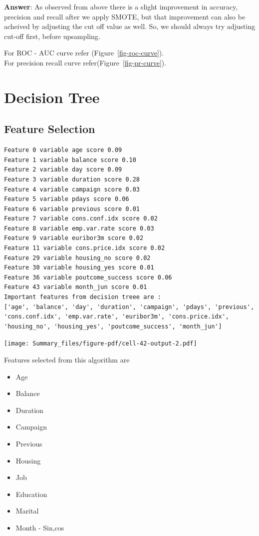 \documentclass[
  letterpaper,
  DIV=11,
  numbers=noendperiod]{scrartcl}
\providecommand{\tightlist}{%
  \setlength{\itemsep}{0pt}\setlength{\parskip}{0pt}}\usepackage{longtable,booktabs,array}
\begin{document}
\textbf{Answer}: As observed from above there is a slight improvement in
accuracy, precision and recall after we apply SMOTE, but that
improvement can also be acheived by adjusting the cut off value as well.
So, we should always try adjusting cut-off first, before upsampling.

For ROC - AUC curve refer (Figure~\ref{fig-roc-curve}).\\
For precision recall curve refer(Figure~\ref{fig-pr-curve}).

\hypertarget{decision-tree}{%
\section{Decision Tree}\label{decision-tree}}

\hypertarget{feature-selection}{%
\subsection{Feature Selection}\label{feature-selection}}

\begin{verbatim}
Feature 0 variable age score 0.09
Feature 1 variable balance score 0.10
Feature 2 variable day score 0.09
Feature 3 variable duration score 0.28
Feature 4 variable campaign score 0.03
Feature 5 variable pdays score 0.06
Feature 6 variable previous score 0.01
Feature 7 variable cons.conf.idx score 0.02
Feature 8 variable emp.var.rate score 0.03
Feature 9 variable euribor3m score 0.02
Feature 11 variable cons.price.idx score 0.02
Feature 29 variable housing_no score 0.02
Feature 30 variable housing_yes score 0.01
Feature 36 variable poutcome_success score 0.06
Feature 43 variable month_jun score 0.01
Important features from decision treee are : 
['age', 'balance', 'day', 'duration', 'campaign', 'pdays', 'previous', 'cons.conf.idx', 'emp.var.rate', 'euribor3m', 'cons.price.idx', 'housing_no', 'housing_yes', 'poutcome_success', 'month_jun']
\end{verbatim}

\texttt{[image: Summary\_files/figure-pdf/cell-42-output-2.pdf]}

Features selected from this algorithm are

\begin{itemize}
\tightlist
\item
  Age
\item
  Balance
\item
  Duration
\item
  Campaign
\item
  Previous
\item
  Housing
\item
  Job
\item
  Education
\item
  Marital
\item
  Month - Sin,cos
\end{itemize}
\end{document}
